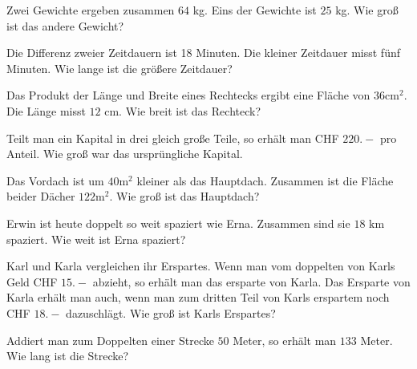 \begin{bbwAufgabenBlock}
\item Zwei Gewichte ergeben zusammen $64$ kg. Eins der Gewichte ist
$25$ kg. Wie groß ist das andere Gewicht?


\item Die Differenz zweier Zeitdauern ist 18 Minuten. Die kleiner
Zeitdauer misst fünf Minuten. Wie lange ist die größere Zeitdauer?


\item Das Produkt der Länge und Breite eines Rechtecks ergibt eine
Fläche von $36 \text{cm}^2$. Die Länge misst $12$ cm. Wie breit ist
das Rechteck?



\item Teilt man ein Kapital in drei gleich große Teile, so erhält man
CHF $220.-$ pro Anteil. Wie groß war das ursprüngliche Kapital.


\item Das Vordach ist um $40 \text{m}^2$ kleiner als das
Hauptdach. Zusammen ist die Fläche beider Dächer $122 \text{m}^2$. Wie
groß ist das Hauptdach?

\noTRAINER{\newpage}

\item Erwin ist heute doppelt so weit spaziert wie Erna. Zusammen sind
sie $18 \text{ km}$ spaziert. Wie weit ist Erna spaziert?


\item Karl und Karla vergleichen ihr Erspartes. Wenn man vom doppelten
von Karls Geld CHF $15.-$ abzieht, so erhält man das ersparte von
Karla. Das Ersparte von Karla erhält man auch, wenn man zum dritten
Teil von Karls erspartem noch CHF $18.-$ dazuschlägt. Wie groß ist
Karls Erspartes?

\item Addiert man zum Doppelten einer Strecke $50$ Meter, so erhält man
$133$ Meter. Wie lang ist die Strecke?


\end{bbwAufgabenBlock}
